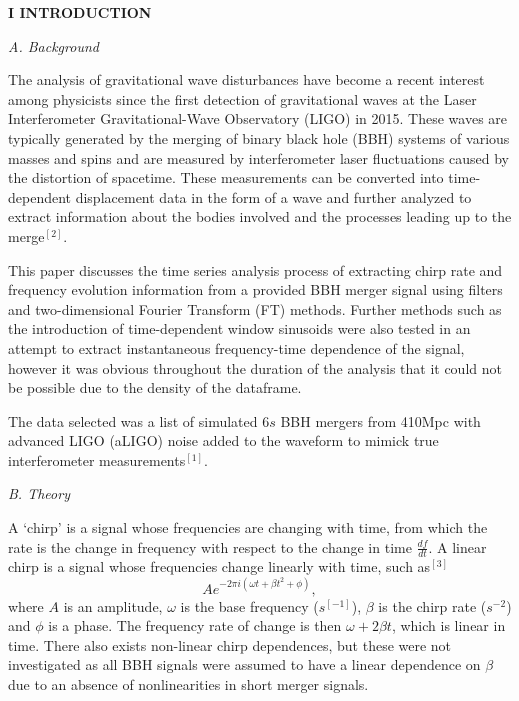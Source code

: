 \documentclass[12pt]{article}
\begin{document}
\begin{multicols}{2}
    
\begin{center}
    \textbf{I \hspace{5pt} INTRODUCTION}

\vspace{5pt}

    \textit{A. Background}

\vspace{-5pt}
\end{center}

The analysis of gravitational wave disturbances have become a recent interest among physicists since the first detection of gravitational waves at the Laser Interferometer Gravitational-Wave Observatory (LIGO) in 2015. 
These waves are typically generated by the merging of binary black hole (BBH) systems of various masses and spins and are measured by interferometer laser fluctuations caused by the distortion of spacetime. These measurements can be converted into time-dependent displacement data in the form of a wave and further analyzed to extract information about the bodies involved and the processes leading up to the merge$^{[2]}$. 

This paper discusses the time series analysis process of extracting chirp rate and frequency evolution information from a provided BBH merger signal using filters and two-dimensional Fourier Transform (FT) methods. Further methods such as the introduction of time-dependent window sinusoids were also tested in an attempt to extract instantaneous frequency-time dependence of the signal, however it was obvious throughout the duration of the analysis that it could not be possible due to the density of the dataframe. 

The data selected was a list of simulated 6$s$ BBH mergers from 410Mpc with advanced LIGO (aLIGO) noise added to the waveform to mimick true interferometer measurements$^{[1]}$. 
\begin{center}
    \textit{B. Theory}\\
\end{center}

A `chirp' is a signal whose frequencies are changing with time, from which the rate is the change in frequency with respect to the change in time $\frac{df}{dt}$. A linear chirp is a signal whose frequencies change linearly with time, such as$^{[3]}$ 
\[
    Ae^{-2\pi i (\omega t + \beta t^2 + \phi)},\tag{1}
\] 
where $A$ is an amplitude, $\omega$ is the base frequency ($s^{[-1]}$), $\beta$ is the chirp rate ($s^{-2}$) and $\phi$ is a phase. The frequency rate of change is then $\omega + 2\beta t$, which is linear in time. There also exists non-linear chirp dependences, but these were not investigated as all BBH signals were assumed to have a linear dependence on $\beta$ due to an absence of nonlinearities in short merger signals. 


\end{multicols}
\end{document}
